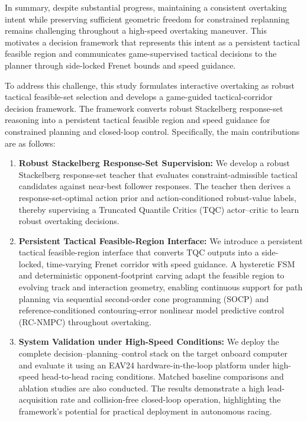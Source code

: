 \documentclass[journal,twoside,web]{ieeecolor}
\begin{document}
In summary, despite substantial progress, maintaining a consistent overtaking
intent while preserving sufficient geometric freedom for constrained
replanning remains challenging throughout a high-speed overtaking maneuver.
This motivates a decision framework that represents this intent as a persistent
tactical feasible region and communicates game-supervised tactical decisions
to the planner through side-locked Frenet bounds and speed guidance.


To address this challenge, this study formulates interactive overtaking as
robust tactical feasible-set selection and develops a game-guided
tactical-corridor decision framework. The framework converts robust Stackelberg
response-set reasoning into a persistent tactical feasible region and speed
guidance for constrained planning and closed-loop control. Specifically, the
main contributions are as follows:

\begin{enumerate}

\item \textbf{Robust Stackelberg Response-Set Supervision:}
We develop a robust Stackelberg response-set teacher that evaluates constraint-admissible tactical candidates against near-best follower responses. The teacher then derives a response-set-optimal action prior and action-conditioned robust-value labels, thereby supervising a Truncated Quantile Critics (TQC) actor--critic to learn robust overtaking decisions.

\item \textbf{Persistent Tactical Feasible-Region Interface:}
We introduce a persistent tactical feasible-region interface that converts TQC outputs into a side-locked, time-varying Frenet corridor with speed guidance. 
A hysteretic FSM and deterministic opponent-footprint carving adapt the feasible region to evolving track and interaction geometry, enabling continuous support for path planning via sequential second-order cone programming (SOCP) and reference-conditioned contouring-error nonlinear model predictive control (RC-NMPC) throughout overtaking.


\item \textbf{System Validation under High-Speed Conditions:}
We deploy the complete decision--planning--control stack on the target onboard computer and evaluate it using an EAV24 hardware-in-the-loop platform under high-speed head-to-head racing conditions. Matched baseline comparisons and ablation studies are also conducted. The results demonstrate a high lead-acquisition rate and collision-free closed-loop operation, highlighting the framework's potential for practical deployment in autonomous racing.

\end{enumerate}
\end{document}
